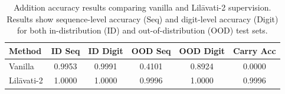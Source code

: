 \begin{table}[h]
\centering
\caption{Addition accuracy results comparing vanilla and Lil\={a}vati-2 supervision. Results show sequence-level accuracy (Seq) and digit-level accuracy (Digit) for both in-distribution (ID) and out-of-distribution (OOD) test sets.}
\label{tab:addition_results}
\begin{tabular}{lccccc}
\toprule
\textbf{Method} & \textbf{ID Seq} & \textbf{ID Digit} & \textbf{OOD Seq} & \textbf{OOD Digit} & \textbf{Carry Acc} \\
\midrule
Vanilla & 0.9953 & 0.9991 & 0.4101 & 0.8924 & 0.0000 \\
Lil\={a}vati-2 & 1.0000 & 1.0000 & 0.9996 & 1.0000 & 0.9996 \\
\bottomrule
\end{tabular}
\end{table}
